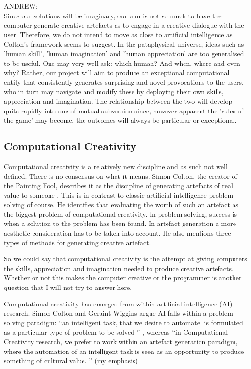 \begin{draft}
  ANDREW:\\
  Since our solutions will be imaginary, our aim is not so much to have the computer generate creative artefacts as to engage in a creative dialogue with the user. Therefore, we do not intend to move as close to artificial intelligence as Colton's framework seems to suggest. In the pataphysical universe, ideas such as 'human skill', 'human imagination' and 'human appreciation' are too generalised to be useful. One may very well ask: which human? And when, where and even why? Rather, our project will aim to produce an exceptional computational entity that consistently generates surprising and novel provocations to the users, who in turn may navigate and modify these by deploying their own skills, appreciation and imagination. The relationship between the two will develop quite rapidly into one of mutual subversion since, however apparent the 'rules of the game' may become, the outcomes will always be particular or exceptional.
\end{draft}

\subsection{Computational Creativity}

Computational creativity is a relatively new discipline and as such not well defined. There is no consensus on what it means. Simon Colton, the creator of the Painting Fool, describes it as the discipline of generating artefacts of real value to someone \citep{Colton2008}. This is in contrast to classic artificial intelligence problem solving of course. He identifies that evaluating the worth of such an artefact as the biggest problem of computational creativity. In problem solving, success is when a solution to the problem has been found. In artefact generation a more aesthetic consideration has to be taken into account. He also mentions three types of methods for generating creative artefact.

So we could say that computational creativity is the attempt at giving computers the skills, appreciation and imagination needed to produce creative artefacts. Whether or not this makes the computer creative or the programmer is another question that I will not try to answer here.

Computational creativity has emerged from within artificial intelligence (AI) research. Simon Colton and Geraint Wiggins argue AI falls within a problem solving paradigm: ``an intelligent task, that we desire to automate, is formulated as a particular type of problem to be solved '' \citep[p.2]{Colton2012},  whereas ``in Computational Creativity research, we prefer to work within an artefact generation paradigm, where the automation of an intelligent task is seen as an opportunity to produce something of cultural value. '' \citep[p.2]{Colton2012}(my emphasis)

